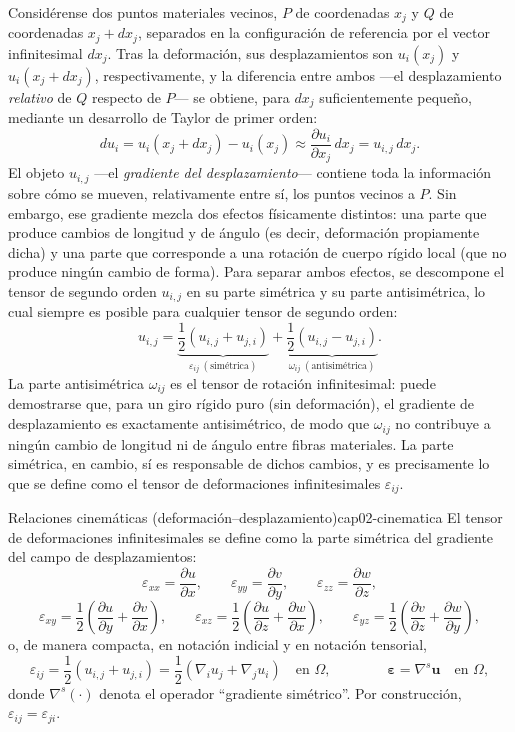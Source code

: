 Considérense dos puntos materiales vecinos, $P$ de coordenadas $x_j$ y $Q$ de coordenadas $x_j+dx_j$, separados en la configuración de referencia por el vector infinitesimal $dx_j$. Tras la deformación, sus desplazamientos son $u_i(x_j)$ y $u_i(x_j+dx_j)$, respectivamente, y la diferencia entre ambos —el desplazamiento \emph{relativo} de $Q$ respecto de $P$— se obtiene, para $dx_j$ suficientemente pequeño, mediante un desarrollo de Taylor de primer orden:
\[
du_i = u_i(x_j+dx_j) - u_i(x_j) \approx \frac{\partial u_i}{\partial x_j}\,dx_j = u_{i,j}\,dx_j.
\]
El objeto $u_{i,j}$ —el \emph{gradiente del desplazamiento}— contiene toda la información sobre cómo se mueven, relativamente entre sí, los puntos vecinos a $P$. Sin embargo, ese gradiente mezcla dos efectos físicamente distintos: una parte que produce cambios de longitud y de ángulo (es decir, deformación propiamente dicha) y una parte que corresponde a una rotación de cuerpo rígido local (que no produce ningún cambio de forma). Para separar ambos efectos, se descompone el tensor de segundo orden $u_{i,j}$ en su parte simétrica y su parte antisimétrica, lo cual siempre es posible para cualquier tensor de segundo orden:
\[
u_{i,j} = \underbrace{\frac{1}{2}\left(u_{i,j}+u_{j,i}\right)}_{\varepsilon_{ij} \ (\text{simétrica})} + \underbrace{\frac{1}{2}\left(u_{i,j}-u_{j,i}\right)}_{\omega_{ij} \ (\text{antisimétrica})}.
\]
La parte antisimétrica $\omega_{ij}$ es el tensor de rotación infinitesimal: puede demostrarse que, para un giro rígido puro (sin deformación), el gradiente de desplazamiento es exactamente antisimétrico, de modo que $\omega_{ij}$ no contribuye a ningún cambio de longitud ni de ángulo entre fibras materiales. La parte simétrica, en cambio, sí es responsable de dichos cambios, y es precisamente lo que se define como el tensor de deformaciones infinitesimales $\varepsilon_{ij}$.

\begin{ecnimportante}{Relaciones cinemáticas (deformación--desplazamiento)}{cap02-cinematica}
El tensor de deformaciones infinitesimales se define como la parte simétrica del gradiente del campo de desplazamientos:
\[
\varepsilon_{xx} = \frac{\partial u}{\partial x}, \qquad
\varepsilon_{yy} = \frac{\partial v}{\partial y}, \qquad
\varepsilon_{zz} = \frac{\partial w}{\partial z},
\]
\[
\varepsilon_{xy} = \frac{1}{2}\left(\frac{\partial u}{\partial y}+\frac{\partial v}{\partial x}\right), \qquad
\varepsilon_{xz} = \frac{1}{2}\left(\frac{\partial u}{\partial z}+\frac{\partial w}{\partial x}\right), \qquad
\varepsilon_{yz} = \frac{1}{2}\left(\frac{\partial v}{\partial z}+\frac{\partial w}{\partial y}\right),
\]
o, de manera compacta, en notación indicial y en notación tensorial,
\[
\varepsilon_{ij} = \frac{1}{2}\left(u_{i,j}+u_{j,i}\right) = \frac{1}{2}\left(\nabla_i u_j + \nabla_j u_i\right) \quad \text{en } \Omega, \qquad\qquad \bm\varepsilon = \nabla^{s}\bm u \quad \text{en } \Omega,
\]
donde $\nabla^{s}(\cdot)$ denota el operador ``gradiente simétrico''. Por construcción, $\varepsilon_{ij}=\varepsilon_{ji}$.
\end{ecnimportante}

